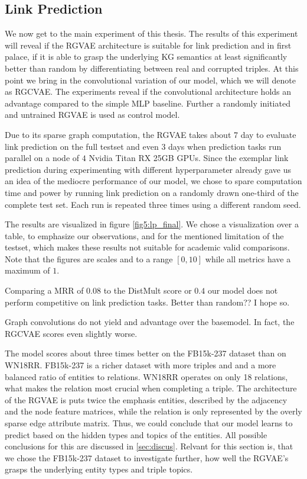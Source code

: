\subsection{Link Prediction}


 We now get to the main experiment of this thesis. The results of this experiment will reveal if the RGVAE architecture is suitable for link prediction and in first palace, if it is able to grasp the underlying KG semantics at least significantly better than random by differentiating between real and corrupted triples. At this point we bring in the convolutional variation of our model, which we will denote as RGCVAE. The experiments reveal if the convolutional architecture holds an advantage compared to the simple MLP baseline. Further a randomly initiated and untrained RGVAE is used as control model.
 
 Due to its sparse graph computation, the RGVAE takes about 7 day to evaluate link prediction on the full testset and even 3 days when prediction tasks run parallel on a node of $4$ Nvidia Titan RX 25GB GPUs. Since the exemplar link prediction during experimenting with different hyperparameter already gave us an idea of the mediocre performance of our model, we chose to spare computation time and power by running link prediction on a randomly drawn one-third of the complete test set. Each run is repeated three times using a different random seed.

The results are visualized in figure \ref{fig5:lp_final}. We chose a visualization over a table, to emphasize our observations, and for the mentioned limitation of the testset, which makes these results not suitable for academic valid comparisons. Note that the figures are scales and to a range $[0,10]$ while all metrics have a maximum of $1$.

Comparing a MRR of $0.08$ to the DistMult score or $0.4$ our model does not perform competitive on link prediction tasks.
Better than random?? I hope so.

Graph convolutions do not yield and advantage over the basemodel. In fact, the RGCVAE scores even slightly worse. 

The model scores about three times better on the FB15k-237 dataset than on WN18RR. FB15k-237 is a richer dataset with more triples and and a more balanced ratio of entities to relations. WN18RR operates on only 18 relations, what makes the relation most crucial when completing a triple. The architecture of the RGVAE is puts twice the emphasis entities, described by the adjacency and the node feature matrices, while the relation is only represented by the overly sparse edge attribute matrix. Thus, we could conclude that our model learns to predict based on the hidden types and topics of the entities. All possible conclusions for this are discussed in \ref{sec:discus}. Relvant for this section is, that we chose the FB15k-237 dataset to investigate further, how well the RGVAE's grasps the underlying entity types and triple topics.   

